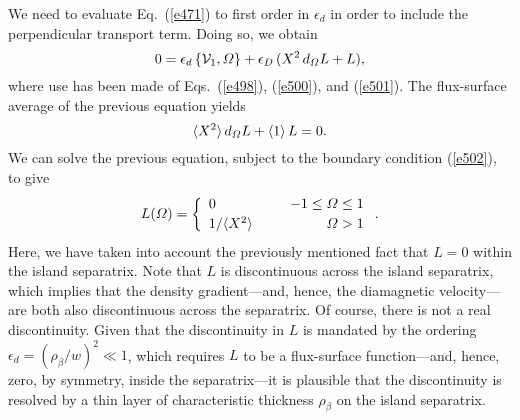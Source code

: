 \documentclass[12pt,prb,aps]{revtex4-1}
\begin{document}
We need to evaluate Eq.~(\ref{e471}) to first order in $\epsilon_d$ in order to include the perpendicular transport term. Doing so,
we obtain
\begin{equation}
0= \epsilon_d\,\{{\cal V}_1, {\mit\Omega}\} + \epsilon_D\,(X^2\,d_{\mit\Omega} L + L),
\end{equation}
where use has been made of Eqs.~(\ref{e498}), (\ref{e500}),  and (\ref{e501}). The flux-surface average of the
previous equation yields
\begin{equation}
\langle X^2\rangle\,d_{\mit\Omega} L +\langle 1\rangle\,L = 0.
\end{equation}
We can solve the previous equation, subject to the boundary condition (\ref{e502}), to give
\begin{equation}\label{e526}
L({\mit\Omega})=\left\{
\begin{array}{llr}
0&&-1\leq {\mit\Omega}\leq 1\\[0.5ex]
1/\langle X^2\rangle&~~&{\mit\Omega}>1
\end{array}\right..
\end{equation}
Here, we have taken into account the previously mentioned fact that $L=0$ within the island separatrix.
Note that $L$ is discontinuous across the island separatrix, which implies that the density gradient---and, hence,
the diamagnetic velocity---are both also discontinuous across the separatrix. Of course, there is not a real
discontinuity. Given that the discontinuity in $L$ is mandated by the ordering $\epsilon_d=(\rho_\beta/w)^2\ll 1$, which
requires $L$ to be a flux-surface function---and, hence, zero, by symmetry, inside the separatrix---it is plausible that the discontinuity is resolved by a thin layer of characteristic thickness $\rho_\beta$ on the island
separatrix.
\end{document}
